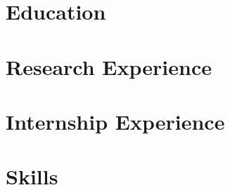 \documentclass[10pt]{article}
\begin{document}
    \section{Education}
    

    \section{Research Experience}
    

    \section{Internship Experience}
    

    \section{Skills}
    
\end{document}
